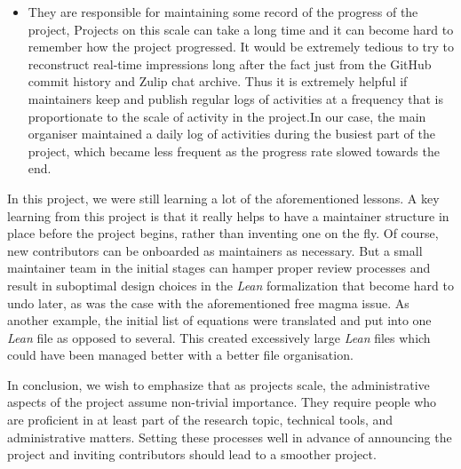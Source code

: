 \begin{itemize}
    \item They are responsible for maintaining some record of the progress of the project, Projects on this scale can take a long time and it can become hard to remember how the project progressed. It would be extremely tedious to try to reconstruct real-time impressions long after the fact just from the GitHub commit history and Zulip chat archive. Thus it is extremely helpful if maintainers keep and publish regular logs of activities at a frequency that is proportionate to the scale of activity in the project.In our case, the main organiser maintained a daily log of activities during the busiest part of the project, which became less frequent as the progress rate slowed towards the end.
\end{itemize}

In this project, we were still learning a lot of the aforementioned lessons. A key learning from this project is that it really helps to have a maintainer structure in place before the project begins, rather than inventing one on the fly. Of course, new contributors can be onboarded as maintainers as necessary. But a small maintainer team in the initial stages can hamper proper review processes and result in suboptimal design choices in the  \emph{Lean} formalization that become hard to undo later, as was the case with the aforementioned free magma issue. As another example, the initial list of equations were translated and put into one  \emph{Lean} file as opposed to several. This created excessively large  \emph{Lean} files which could have been managed better with a better file organisation.

In conclusion, we wish to emphasize that as projects scale, the administrative aspects of the project assume non-trivial importance. They require people who are proficient in at least part of the research topic, technical tools, and administrative matters. Setting these processes well in advance of announcing the project and inviting contributors should lead to a smoother project.

